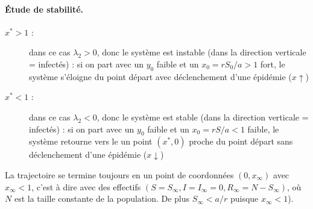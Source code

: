 \paragraph*{\'Etude de stabilité.}
\begin{description}
  \item[$x^* > 1$ :] dans ce cas $\lambda_2 > 0$, donc le système est instable (dans la direction verticale = infectés) : si on part avec un $y_0$ faible et un $x_0 = rS_0/a > 1$ fort, le système s'éloigne du point départ avec déclenchement d'une épidémie ($x \uparrow$)
  \item[$x^* < 1$ :] dans ce cas $\lambda_2 < 0$, donc le système est stable (dans la direction verticale = infectés) : si on part avec un $y_0$ faible et un $x_0 = rS/a < 1$ faible, le système retourne vers le un point $(x^*, 0)$ proche du point départ sans déclenchement d'une épidémie ($x \downarrow$)
\end{description}


La trajectoire se termine toujours en un point de coordonnées $(0, x_\infty)$ avec $x_\infty < 1$, c'est à dire avec des effectifs $(S = S_\infty, I = I_\infty = 0, R_\infty = N - S_\infty)$, où $N$ est la taille constante de la population. De plus $S_\infty < a/r$ puisque $x_\infty < 1$).


